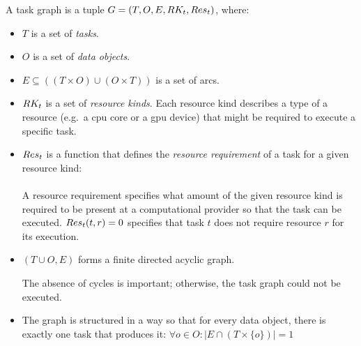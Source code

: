 \vspace{2mm} A task graph is a tuple
$G = (T, O, E, RK_t, Res_t)$, where:
\begin{itemize}[itemsep=0pt]
	\item $T$ is a set of \emph{tasks}.
	\item $O$ is a set of \emph{data objects}.
	\item $E \subseteq ((T\times{}O) \cup (O\times{}T))$ is a set of arcs.
	\item $RK_t$ is a set of \emph{resource kinds}. Each resource kind
	      describes a type of a resource (e.g.\ a \gls{cpu} core or a \gls{gpu} device)
	      that might be required to execute a specific task.
	\item $Res_t$ is a function that defines the
	      \emph{resource requirement} of a task for a given resource kind: \\
	       \\
	      A resource requirement specifies what amount of the given resource kind is required to be present
	      at a computational provider so that the task can be executed. $Res_t(t, r) = 0$ specifies that
	      task $t$ does not require resource $r$ for its execution.
	\item $(T \cup O, E)$ forms a finite directed acyclic graph.

		  The absence of cycles is important; otherwise, the task graph could not be executed.
	\item The graph is structured in a way so that for every data
	object, there is exactly one task that produces it: $\forall o \in O: |E \cap (T \times \{o\})| = 1$
\end{itemize}

